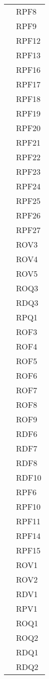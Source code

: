 \begin{longtable}{| p{5cm} | p{5cm} |}
				&	RPF8 \\
				&	RPF9 \\
				&	RPF12 \\
				&	RPF13 \\
				&	RPF16 \\
				&	RPF17 \\
				&	RPF18 \\
				&	RPF19 \\
				&	RPF20 \\
				&	RPF21 \\
				&	RPF22 \\
				&	RPF23 \\
				&	RPF24 \\
				&	RPF25\\
				&	RPF26 \\
				&	RPF27 \\
				&	ROV3 \\
				&	ROV4 \\
				&	ROV5 \\
				&	ROQ3 \\
				&	RDQ3 \\
				&	RPQ1 \\
				 \hline
					
		\rowcolor{LightGray}
		\multirow[t]{23}{*}{\cellcolor{LightGray}}{Capitolato} 
				 & ROF3 \\
				\rowcolor{LightGray} &	ROF4 \\
				\rowcolor{LightGray} &	ROF5 \\
				\rowcolor{LightGray} &	ROF6 \\
				\rowcolor{LightGray} &	ROF7 \\
				\rowcolor{LightGray} &	ROF8 \\
				\rowcolor{LightGray} &	ROF9 \\
				\rowcolor{LightGray} &	RDF6 \\
				\rowcolor{LightGray} &	RDF7 \\
				\rowcolor{LightGray} &	RDF8 \\
				\rowcolor{LightGray} &	RDF10 \\
				\rowcolor{LightGray} &	RPF6 \\
				\rowcolor{LightGray} &	RPF10 \\
				\rowcolor{LightGray} &	RPF11 \\
				\rowcolor{LightGray} &	RPF14 \\
				\rowcolor{LightGray} &	RPF15 \\
				\rowcolor{LightGray} &	ROV1 \\
				\rowcolor{LightGray} &	ROV2 \\
				\rowcolor{LightGray} &	RDV1 \\
				\rowcolor{LightGray} &	RPV1 \\
				\rowcolor{LightGray} &	ROQ1 \\
				\rowcolor{LightGray} &	ROQ2\\
				\rowcolor{LightGray} &	RDQ1\\
				\rowcolor{LightGray} &	RDQ2 \\
		

\end{longtable}
